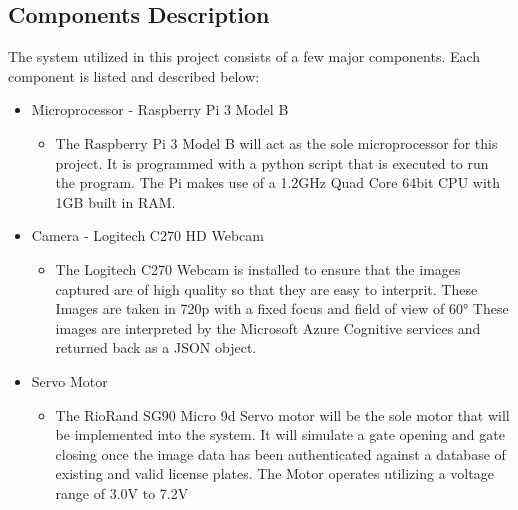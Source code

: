 \documentclass[a4paper,12pt]{article}
\begin{document}
\newpage
\subsection{Components Description}

The system utilized in this project consists of a few major components. Each component is listed and described below:

\begin{itemize}
\item Microprocessor - Raspberry Pi 3 Model B
\begin{itemize}
    \item The Raspberry Pi 3 Model B will act as the sole microprocessor for this project. It is programmed with a python script that is executed to run the program. The Pi makes use of  a 1.2GHz Quad Core 64bit CPU with 1GB built in RAM.
\end{itemize} 
\item Camera - Logitech C270 HD Webcam
\begin{itemize}
    \item The Logitech C270 Webcam is installed to ensure that the images captured are of high quality so that they are easy to interprit. These Images are taken in 720p with a fixed focus and field of view of \ang{60} These images are interpreted by the Microsoft Azure Cognitive services and returned back as a JSON object.
\end{itemize}
\item Servo Motor
\begin{itemize}
    \item The RioRand SG90 Micro 9d Servo motor will be the sole motor that will be implemented into the system. It will simulate a gate opening and gate closing once the image data has been authenticated against a database of existing and valid license plates. The Motor operates utilizing a voltage range of 3.0V to 7.2V
\end{itemize}
\end{itemize}
\end{document}
